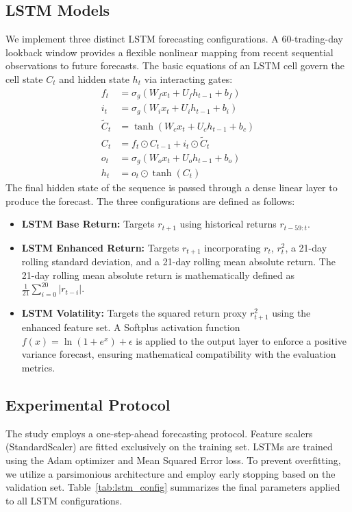 \documentclass[11pt,a4paper]{article}
\begin{document}
\subsection{LSTM Models}
We implement three distinct LSTM forecasting configurations. A 60-trading-day lookback window provides a flexible nonlinear mapping from recent sequential observations to future forecasts. The basic equations of an LSTM cell govern the cell state $C_t$ and hidden state $h_t$ via interacting gates:
\begin{align}
    f_t &= \sigma_g(W_f x_t + U_f h_{t-1} + b_f) \\
    i_t &= \sigma_g(W_i x_t + U_i h_{t-1} + b_i) \\
    \tilde{C}_t &= \tanh(W_c x_t + U_c h_{t-1} + b_c) \\
    C_t &= f_t \odot C_{t-1} + i_t \odot \tilde{C}_t \\
    o_t &= \sigma_g(W_o x_t + U_o h_{t-1} + b_o) \\
    h_t &= o_t \odot \tanh(C_t)
\end{align}
The final hidden state of the sequence is passed through a dense linear layer to produce the forecast. The three configurations are defined as follows:
\begin{itemize}
    \item \textbf{LSTM Base Return:} Targets $r_{t+1}$ using historical returns $r_{t-59:t}$.
    \item \textbf{LSTM Enhanced Return:} Targets $r_{t+1}$ incorporating $r_t$, $r_t^2$, a 21-day rolling standard deviation, and a 21-day rolling mean absolute return. The 21-day rolling mean absolute return is mathematically defined as $\frac{1}{21} \sum_{i=0}^{20} |r_{t-i}|$.
    \item \textbf{LSTM Volatility:} Targets the squared return proxy $r_{t+1}^2$ using the enhanced feature set. A Softplus activation function $f(x) = \ln(1 + e^x) + \epsilon$ is applied to the output layer to enforce a positive variance forecast, ensuring mathematical compatibility with the evaluation metrics.
\end{itemize}

\subsection{Experimental Protocol}
The study employs a one-step-ahead forecasting protocol. Feature scalers (StandardScaler) are fitted exclusively on the training set. LSTMs are trained using the Adam optimizer and Mean Squared Error loss. To prevent overfitting, we utilize a parsimonious architecture and employ early stopping based on the validation set. Table~\ref{tab:lstm_config} summarizes the final parameters applied to all LSTM configurations.
\end{document}
